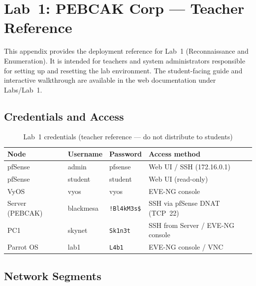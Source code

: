 
\chapter{Lab~1: PEBCAK Corp --- Teacher Reference}
\label{app:lab1}

This appendix provides the deployment reference for Lab~1 (Reconnaissance and
Enumeration). It is intended for teachers and system administrators responsible
for setting up and resetting the lab environment. The student-facing guide and
interactive walkthrough are available in the web documentation under Labs/Lab~1.

\section*{Credentials and Access}

\begin{table}[H]
\centering
\begin{tabularx}{\textwidth}{lll>{\raggedright\arraybackslash}X}
\toprule
\textbf{Node} & \textbf{Username} & \textbf{Password} & \textbf{Access method} \\
\midrule
pfSense        & admin      & pfsense             & Web UI / SSH (172.16.0.1)           \\
pfSense        & student    & student             & Web UI (read-only)                  \\
VyOS           & vyos       & vyos                & EVE-NG console                      \\
Server (PEBCAK)& blackmesa  & \texttt{!Bl4kM3s\$} & SSH via pfSense DNAT (TCP~22)        \\
PC1            & skynet     & \texttt{Sk1n3t}     & SSH from Server / EVE-NG console    \\
Parrot OS      & lab1       & \texttt{L4b1}       & EVE-NG console / VNC                \\
\bottomrule
\end{tabularx}
\caption{Lab~1 credentials (teacher reference --- do not distribute to students)}
\label{tab:lab1-creds}
\end{table}

\section*{Network Segments}

